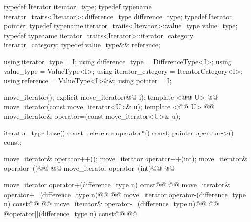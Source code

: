 %
\begin{codeblock}
namespace std { @@
  template <@@>
    @@
  class move_iterator {
  public:
\end{codeblock}\begin{removedblock}\begin{codeblock}
    typedef Iterator                                              iterator_type;
    typedef typename iterator_traits<Iterator>::difference_type   difference_type;
    typedef Iterator                                              pointer;
    typedef typename iterator_traits<Iterator>::value_type        value_type;
    typedef typename iterator_traits<Iterator>::iterator_category iterator_category;
    typedef value_type&&                                          reference;
\end{codeblock}\end{removedblock}\begin{addedblock}\begin{codeblock}
    using iterator_type = I;
    using difference_type = DifferenceType<I>;
    using value_type = ValueType<I>;
    using iterator_category = IteratorCategory<I>;
    using reference = ValueType<I>&&;
    using pointer = I;
\end{codeblock}\end{addedblock}\begin{codeblock}

    move_iterator();
    explicit move_iterator(@@ i);
    template <@@ U>
      @@
    move_iterator(const move_iterator<U>& u);
    template <@@ U>
      @@
    move_iterator& operator=(const move_iterator<U>& u);

    iterator_type base() const;
    reference operator*() const;
    pointer operator->() const;

    move_iterator& operator++();
    move_iterator operator++(int);
    move_iterator& operator--()@\removed{;}@
      @@
    move_iterator operator--(int)@\removed{;}@
      @@

    move_iterator operator+(difference_type n) const@\removed{;}@
      @@
    move_iterator& operator+=(difference_type n)@\removed{;}@
      @@
    move_iterator operator-(difference_type n) const@\removed{;}@
      @@
    move_iterator& operator-=(difference_type n)@\removed{;}@
      @@
    @\unspec@ operator[](difference_type n) const@\removed{;}@
      @@


\end{codeblock}
